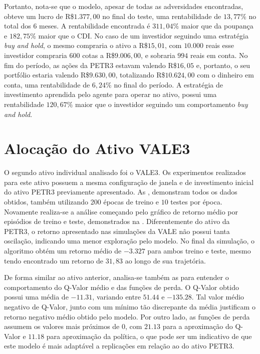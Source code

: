 Portanto, nota-se que o modelo, apesar de todas as adversidades encontradas, obteve um lucro de R\$$1.377,00$ no final do teste, uma rentabilidade de $13,77\%$ no total dos 6 meses. A rentabilidade encontrada é $311,04\%$ maior que da poupança e $182,75\%$ maior que o \acrshort{CDI}. No caso de um investidor seguindo uma estratégia \emph{buy and hold}, o mesmo compraria o ativo a R\$$15,01$, com $10.000$ reais esse investidor compraria $600$ cotas a R\$$9.006,00$, e sobraria $994$ reais em conta. No fim do período, as ações da PETR3 estavam valendo R\$$16,05$ e, portanto, o seu portfólio estaria valendo R\$$9.630,00$, totalizando R\$$10.624,00$ com o dinheiro em conta, uma rentabilidade de $6,24\%$ no final do período. A estratégia de investimento aprendida pelo agente para operar no ativo, possui uma rentabilidade $120,67\%$ maior que o investidor seguindo um comportamento \emph{buy and hold}.
 
\section{Alocação do Ativo VALE3}

O segundo ativo individual analisado foi o VALE3. Os experimentos realizados para este ativo possuem a mesma configuração de janela e de investimento inicial do ativo PETR3 previamente apresentado. As , demonstram todos os dados obtidos, também utilizando 200 épocas de treino e $10$ testes por época. Novamente realiza-se a análise começando pelo gráfico de retorno médio por episódios de treino e teste, demonstrados na . Diferentemente do ativo da PETR3, o retorno apresentado nas simulações da VALE não possui tanta oscilação, indicando uma menor exploração pelo modelo. No final da simulação, o algoritmo obtém um retorno médio de $-3.327$ para ambos treino e teste, mesmo tendo encontrado um retorno de $31,83$ ao longo de sua trajetória. 


De forma similar ao ativo anterior, analisa-se também as  para entender o comportamento do Q-Valor médio e das funções de perda. O Q-Valor obtido possui uma média de $-11.31$, variando entre $51.44$ e $-135.28$. Tal valor médio negativo de Q-Valor, junto com um mínimo tão discrepante da média justificam o retorno negativo médio obtido pelo modelo. Por outro lado, as funções de perda assumem os valores mais próximos de $0$, com $21.13$ para a aproximação do Q-Valor e $11.18$ para aproximação da política, o que pode ser um indicativo de que este modelo é mais adaptável a replicações em relação ao do ativo PETR3. 

